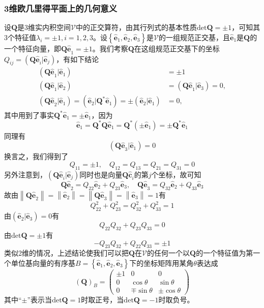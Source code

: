 \documentclass[main.tex]{subfiles}
\begin{document}
\subsubsection{3维欧几里得平面上的几何意义}
设$\mathbf{Q}$是3维实内积空间$\mathcal{V}$中的正交算符，由其行列式的基本性质$\mathrm{det}\mathbf{Q}=\pm 1$，可知其3个特征值$\lambda_i=\pm 1,i=1,2,3$。设$\left\{\mathbf{\hat{e}}_1,\mathbf{\hat{e}}_2,\mathbf{\hat{e}}_3\right\}$是$\mathcal{V}$的一组规范正交基，且$\mathbf{\hat{e}}_1$是$\mathbf{Q}$的一个特征向量，即$\mathbf{Q\hat{e}}_1=\pm 1$。我们考察$\mathbf{Q}$在这组规范正交基下的坐标$Q_{ij}=\left(\mathbf{Q\hat{e}}_i|\mathbf{\hat{e}}_j\right)$，有如下结论
\begin{align*}
    \left(\mathbf{Q\hat{e}}_1|\mathbf{\hat{e}}_1\right)                                                                                                                      & =\pm 1                                                  \\
    \left(\mathbf{Q\hat{e}}_1|\mathbf{\hat{e}}_2\right)                                                                                                                      & =\left(\mathbf{Q\hat{e}}_1|\mathbf{\hat{e}}_3\right)=0, \\
    \left(\mathbf{Q\hat{e}}_2|\mathbf{\hat{e}}_1\right)=\left(\mathbf{\hat{e}}_2|\mathbf{Q}^*\mathbf{\hat{e}}_1\right)=\pm\left(\mathbf{\hat{e}}_2|\mathbf{\hat{e}}_1\right) & =0,
\end{align*}
其中用到了事实$\mathbf{Q}^*\mathbf{\hat{e}}_1=\pm\mathbf{\hat{e}}_1$，因为
\[\mathbf{\hat{e}}_1=\mathbf{Q}^*\mathbf{Q}\mathbf{\hat{e}}_1=\mathbf{Q}^*\left(\pm\mathbf{\hat{e}}_1\right)=\pm\mathbf{Q}^*\mathbf{\hat{e}}_1\]
同理有
\[\left(\mathbf{Q\hat{e}}_3|\mathbf{\hat{e}}_1\right)=0\]
换言之，我们得到了
\[Q_{11}=\pm 1,\quad Q_{12}=Q_{13}=Q_{21}=Q_{31}=0\]
另外注意到，$\left(\mathbf{Q\hat{e}}_i|\mathbf{\hat{e}}_j\right)$同时也是向量$\mathbf{Q\hat{c}}_i$的第$j$个坐标，故可知
\[\mathbf{Q\hat{e}}_2=Q_{22}\mathbf{\hat{e}}_2+Q_{23}\mathbf{\hat{e}}_3,\quad\mathbf{Q\hat{e}}_3=Q_{32}\mathbf{\hat{e}}_2+Q_{33}\mathbf{\hat{e}}_3\]
故由$\left\|\mathbf{Q\hat{e}}_2\right\|=\left\|\mathbf{\hat{e}}_2\right\|=\left\|\mathbf{Q\hat{e}}_3\right\|=\left\|\mathbf{\hat{e}}_3\right\|=1$有
\[Q_{22}^2+Q_{23}^2=Q_{32}^2+Q_{33}^2=1\]
由$\left(\mathbf{\hat{e}}_2|\mathbf{\hat{e}}_3\right)=0$有
\[Q_{22}Q_{32}+Q_{23}Q_{33}=0\]
由$\mathrm{det}\mathbf{Q}=\pm 1$有
\[-Q_{23}Q_{32}+Q_{22}Q_{33}=\pm 1\]
类似2维的情况，上述结论使我们可以把$\mathbf{Q}$在$\mathcal{V}$的任何一个以$\mathbf{Q}$的一个特征值为第一个单位基向量的有序基$B=\left\{\mathbf{\hat{e}}_1,\mathbf{\hat{e}}_2,\mathbf{\hat{e}}_3\right\}$下的坐标矩阵用某角$\theta$表达成
\[\left(\mathbf{Q}\right)_B=\left(\begin{array}{ccc}\pm 1&0&0\\0&\cos\theta&\sin\theta\\0&\mp\sin\theta&\pm\cos\theta\end{array}\right)\]
其中“$\pm$”表示当$\mathrm{det}\mathbf{Q}=1$时取正号，当$\mathrm{det}\mathbf{Q}=-1$时取负号。
\end{document}
